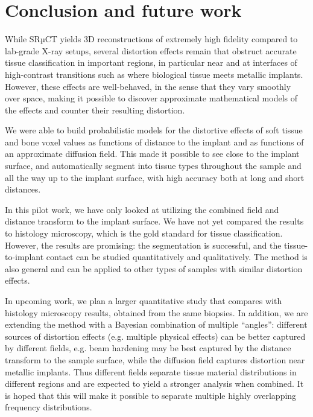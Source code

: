 \section{Conclusion and future work}
\label{sec:conclusion}

While SRµCT yields 3D reconstructions of extremely high fidelity compared to
lab-grade X-ray setups, several distortion effects remain that obstruct
accurate tissue classification in important regions, in particular near and at
interfaces of high-contrast transitions such as where biological tissue meets
metallic implants. However, these effects are well-behaved, in the sense that
they vary smoothly over space, making it possible to discover approximate
mathematical models of the effects and counter their resulting distortion.

We were able to build probabilistic models for the distortive effects of soft
tissue and bone voxel values as functions of distance to the implant and as
functions of an approximate diffusion field. This made it possible to see close
to the implant surface, and automatically segment into tissue types throughout
the sample and all the way up to the implant surface, with high accuracy both
at long and short distances.

In this pilot work, we have only looked at utilizing the combined field and
distance transform to the implant surface. We have not yet compared the results
to histology microscopy, which is the gold standard for tissue classification.
However, the results are promising: the segmentation is successful, and the
tissue-to-implant contact can be studied quantitatively and qualitatively. The
method is also general and can be applied to other types of samples with
similar distortion effects.

In upcoming work, we plan a larger quantitative study that compares with
histology microscopy results, obtained from the same biopsies. In addition, we
are extending the method with a Bayesian combination of multiple ``angles'':
different sources of distortion effects (e.g. multiple physical effects) can be
better captured by different fields, e.g. beam hardening may be best captured
by the distance transform to the sample surface, while the diffusion field
captures distortion near metallic implants. Thus different fields separate
tissue material distributions in different regions and are expected to yield a
stronger analysis when combined. It is hoped that this will make it possible to
separate multiple highly overlapping frequency distributions.

